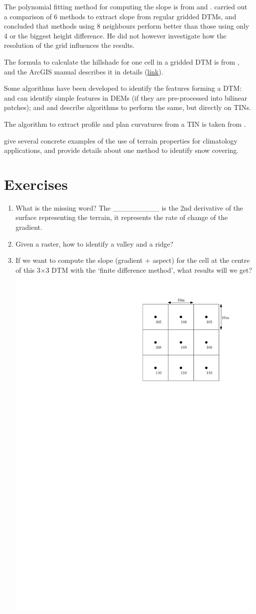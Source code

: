 The polynomial fitting method for computing the slope is from \citet{Evans80} and \citet{Wood96}.
\citet{Skidmore89} carried out a comparison of 6 methods to extract slope from regular gridded DTMs, and concluded that methods using 8 neighbours perform better than those using only 4 or the biggest height difference.
He did not however investigate how the resolution of the grid influences the results.

The formula to calculate the hillshade for one cell in a gridded DTM is from \citet{Burrough98}, and the ArcGIS manual describes it in details (\href{https://desktop.arcgis.com/en/arcmap/10.3/tools/spatial-analyst-toolbox/how-hillshade-works.htm}{link}).

Some algorithms have been developed to identify the features forming a DTM: \citet{Kweon94} and \citet{Schneider05} can identify simple features in DEMs (if they are pre-processed into bilinear patches); and \citet{Magillo09} and \citet{Edelsbrunner01-1} describe algorithms to perform the same, but directly on TINs.

The algorithm to extract profile and plan curvatures from a TIN is taken from \citet{vanKreveld97}.

\citet{Bohner09} give several concrete examples of the use of terrain properties for climatology applications, and provide details about one method to identify snow covering.



%
\section{Exercises}

\begin{enumerate}
  \item What is the missing word? The \_\_\_\_\_\_\_\_\_ is the 2nd derivative of the surface representing the terrain, it represents the rate of change of the gradient.
  \item Given a raster, how to identify a valley and a ridge?
  \item If we want to compute the slope (gradient + aspect) for the cell at the centre of this 3$\times$3 DTM with the `finite difference method', what results will we get?
  \\
  \includegraphics[width=0.4\linewidth]{figs/slope_grid_question}
\end{enumerate}
